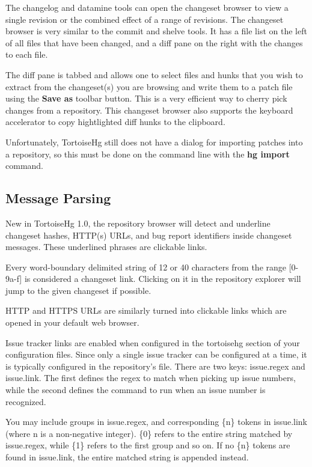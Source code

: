 \documentclass[letterpaper,10pt,english]{manual}
\begin{document}
The changelog and datamine tools can open the changeset browser to view
a single revision or the combined effect of a range of revisions. The
changeset browser is very similar to the commit and shelve tools. It has
a file list on the left of all files that have been changed, and a diff
pane on the right with the changes to each file.

The diff pane is tabbed and allows one to select files and hunks that
you wish to extract from the changeset(s) you are browsing and write
them to a patch file using the \textbf{Save as} toolbar button.  This
is a very efficient way to cherry pick changes from a repository.  This
changeset browser also supports the  keyboard accelerator
to copy hightlighted diff hunks to the clipboard.

Unfortunately, TortoiseHg still does not have a dialog for importing
patches into a repository, so this must be done on the command line with
the \textbf{hg import} command.


\subsection{Message Parsing}

New in TortoiseHg 1.0, the repository browser will detect and underline
changeset hashes, HTTP(s) URLs, and bug report identifiers inside
changeset messages.  These underlined phrases are clickable links.

Every word-boundary delimited string of 12 or 40 characters from the
range {[}0-9a-f{]} is considered a changeset link. Clicking on it in the
repository explorer will jump to the given changeset if possible.

HTTP and HTTPS URLs are similarly turned into clickable links which are
opened in your default web browser.

Issue tracker links are enabled when configured in the tortoisehg
section of your configuration files.  Since only a single issue tracker
can be configured at a time, it is typically configured in the
repository's  file.  There are two keys: issue.regex and
issue.link. The first defines the regex to match when picking up issue
numbers, while the second defines the command to run when an issue
number is recognized.

You may include groups in issue.regex, and corresponding \{n\} tokens in
issue.link (where n is a non-negative integer). \{0\} refers to the entire
string matched by issue.regex, while \{1\} refers to the first group and
so on. If no \{n\} tokens are found in issue.link, the entire matched
string is appended instead.
\end{document}
